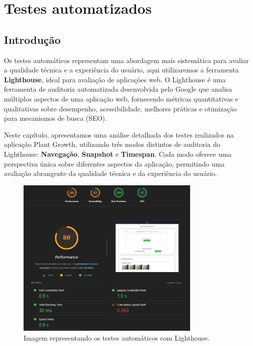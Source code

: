 \chapter{Testes automatizados}

\section{Introdução}

Os testes automáticos representam uma abordagem mais sistemática para avaliar a qualidade técnica e a experiência do usuário, aqui utilizaremos a ferramenta \textbf{Lighthouse}, ideal para avaliação de aplicações web. O Lighthouse é uma ferramenta de auditoria automatizada desenvolvida pelo Google que analisa múltiplos aspectos de uma aplicação web, fornecendo métricas quantitativas e qualitativas sobre desempenho, acessibilidade, melhores práticas e otimização para mecanismos de busca (SEO).

Neste capítulo, apresentamos uma análise detalhada dos testes realizados na aplicação Plant Growth, utilizando três modos distintos de auditoria do Lighthouse: \textbf{Navegação}, \textbf{Snapshot} e \textbf{Timespan}. Cada modo oferece uma perspectiva única sobre diferentes aspectos da aplicação, permitindo uma avaliação abrangente da qualidade técnica e da experiência do usuário.

\begin{figure}[H]
    \centering
    \includegraphics[width=0.8\textwidth]{../figures/hci/testes_automaticos.png}
    \caption{Imagem representando os testes automáticos com Lighthouse.}
    \label{fig:graph-dificuldade-satisfacao}
\end{figure}


